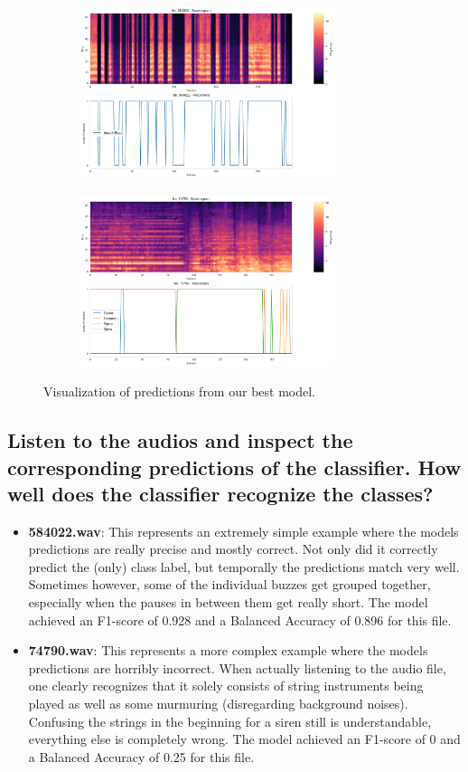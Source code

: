\begin{figure}[htbp]
  \centering
  \begin{subfigure}[b]{0.49\textwidth}
    \includegraphics[width=\textwidth, height=5cm]{figs/6_good.png}
  \end{subfigure}
  \hfill
  \begin{subfigure}[b]{0.49\textwidth}
    \includegraphics[width=\textwidth, height=5cm]{figs/6_bad.png}
  \end{subfigure}
  \caption{Visualization of predictions from our best model.}
  \label{fig:6_plots}
\end{figure}


\subsection{Listen to the audios and inspect the corresponding predictions of the classifier. How well does the classifier recognize the classes?}
\label{sec:Analysing Predictions:b}
\begin{itemize}
    \item \textbf{584022.wav}: This represents an extremely simple example where the models predictions are really precise and mostly correct. Not only did it correctly predict the (only) class label, but temporally the predictions match very well. Sometimes however, some of the individual buzzes get grouped together, especially when the pauses in between them get really short. The model achieved an F1-score of 0.928 and a Balanced Accuracy of 0.896 for this file.
    \item \textbf{74790.wav}: This represents a more complex example where the models predictions are horribly incorrect. When actually listening to the audio file, one clearly recognizes that it solely consists of string instruments being played as well as some murmuring (disregarding background noises). Confusing the strings in the beginning for a siren still is understandable, everything else is completely wrong. The model achieved an F1-score of 0 and a Balanced Accuracy of 0.25 for this file.
\end{itemize}


